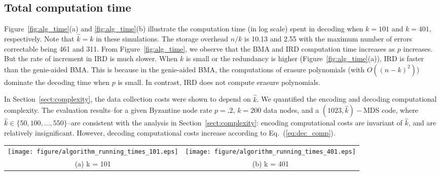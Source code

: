 \documentclass[10pt,journal,letterpaper,compsoc]{IEEEtran}
\newcommand{\0}{{\bf 0}}
\begin{document}
\subsection{Total computation time}
Figure~\ref{fig:alg_time}(a) and \ref{fig:alg_time}(b) illustrate the computation time (in log scale)
spent in decoding when $k=101$ and $k=401$, respectively. Note that $\hat{k}=k$ in these simulations. The storage overhead
$n/k$ is 10.13 and 2.55 with the maximum number of errors correctable being 461
and 311. From Figure~\ref{fig:alg_time}, we observe that the BMA and IRD
computation time increases  as $p$ increases. But the rate of increment in
IRD is much slower. When $k$ is small or the redundancy is higher
(Figure~\ref{fig:alg_time}(a)), IRD is faster than the genie-aided
BMA. This is because in the genie-aided BMA, the computations of erasure
polynomials (with $O((n-k)^2)$) dominate the decoding time when $p$ is small.
In contrast, IRD does not compute erasure polynomials.

In Section~\ref{sect:complexity}, the data collection costs were shown to depend on 
$\hat{k}$. We quantified the encoding and decoding computational
complexity. 
The evaluation results--for a given Byzantine node rate $p=.2$, $k = 200$ data nodes, and a
$(1023,\hat{k})-$MDS code, where $\hat{k}\in\{50,100,...,550\}$--are
consistent with the analysis in Section~\ref{sect:complexity}: 
encoding computational costs are invariant
of $\hat{k}$, and are relatively insignificant. However, decoding computational costs increase according to Eq.~(\ref{eq:dec_comp}).
\begin{comment}
From these results, we conclude that if the joint probability of Byzantine and fail-stop
nodes' is known {\it a priori} to be high, $\hat{k}$ should only be made small, if the given data collector can bear the
increase in decoding computational costs.
\end{comment}
\begin{figure*}[thp]
\begin{center}
\begin{tabular}{cc}
\texttt{[image: figure/algorithm\_running\_times\_101.eps]} &
\texttt{[image: figure/algorithm\_running\_times\_401.eps]} \\
(a) k = 101 & 
(b) k = 401 
\end{tabular}
\caption{Average computation time for $(1023,k)-$MDS decoding against Byzantine node rate, $p$. 
For the given $k$ values, both IRD and BMA cannot successfully decode for $p>0.3$}
\label{fig:alg_time}
\end{center}
\end{figure*}
\end{document}
